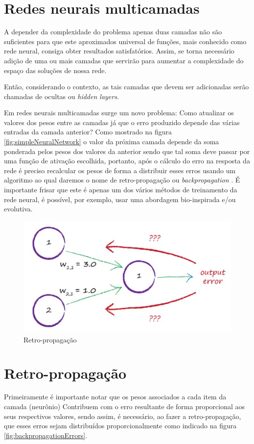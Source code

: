\begin{apendicesenv}
	\section{Redes neurais multicamadas}
		\par A depender da complexidade do problema apenas duas camadas não são suficientes para que este aproximados universal de funções, mais conhecido como rede neural, consiga obter resultados satisfatórios. Assim, se torna necessário adição de uma ou mais camadas que servirão para aumentar a complexidade do espaço das soluções de nossa rede.
		
		\par Então, considerando o contexto, as tais camadas que devem ser adicionadas serão chamadas de ocultas ou \textit{hidden layers}\cite{rashid2016make}. 
		
		\par Em redes neurais multicamadas surge um novo problema: Como atualizar os valores dos pesos entre as camadas já que o erro produzido depende das várias entradas da camada anterior? Como mostrado na figura \ref{fig:simpleNeuralNetwork} o valor da próxima camada depende da soma ponderada pelos pesos dos valores da anterior sendo que tal soma deve passar por uma função de ativação escolhida, portanto, após o cálculo do erro na resposta da rede é preciso recalcular os pesos de forma a distribuir esses erros usando um algoritmo ao qual daremos o nome de retro-propagação ou \textit{backpropagation} \cite{haykinredes}. É importante frisar que este é apenas um dos vários métodos de treinamento da rede neural, é possível, por exemplo, usar uma abordagem bio-inspirada e/ou evolutiva.
		
		\begin{figure}[H]
			\centering
			\caption{Retro-propagação}
			\label{fig:backpropagation}
			\includegraphics[width=0.7\linewidth]{images/TEMPbackpropagation}
		\end{figure}
	
	\section{Retro-propagação}
		\par Primeiramente é importante notar que os pesos associados a cada item da camada (neurônio) Contribuem com o erro resultante de forma proporcional aos seus respectivos valores, sendo assim, é necessário, ao fazer a retro-propagação, que esses erros sejam distribuídos proporcionalmente como indicado na figura \ref{fig:backpropagationErrors}.
		

\end{apendicesenv}
